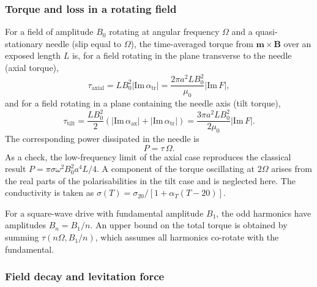 \documentclass[12pt, a4paper]{article}
\begin{document}
\subsubsection*{Torque and loss in a rotating field}

For a field of amplitude $B_0$ rotating at angular frequency $\Omega$ and a quasi-stationary needle (slip equal to $\Omega$), the time-averaged torque from $\mathbf{m}\times\mathbf{B}$ over an exposed length $L$ is, for a field rotating in the plane transverse to the needle (axial torque),
\begin{equation}
\tau_{\text{axial}}
=
L B_0^{2}\left|\mathrm{Im}\,\alpha_{\text{tr}}\right|
=
\frac{2\pi a^{2}L B_0^{2}}{\mu_0}\left|\mathrm{Im}\,F\right|,
\end{equation}
and for a field rotating in a plane containing the needle axis (tilt torque),
\begin{equation}
\tau_{\text{tilt}}
=
\frac{LB_0^{2}}{2}\left(\left|\mathrm{Im}\,\alpha_{\text{ax}}\right|+\left|\mathrm{Im}\,\alpha_{\text{tr}}\right|\right)
=
\frac{3\pi a^{2}LB_0^{2}}{2\mu_0}\left|\mathrm{Im}\,F\right|.
\end{equation}
The corresponding power dissipated in the needle is
\begin{equation}
P=\tau\,\Omega.
\end{equation}
As a check, the low-frequency limit of the axial case reproduces the classical result $P=\pi\sigma\omega^{2}B_0^{2}a^{4}L/4$. A component of the torque oscillating at $2\Omega$ arises from the real parts of the polarisabilities in the tilt case and is neglected here. The conductivity is taken as $\sigma(T)=\sigma_{20}/\left[1+\alpha_T(T-20)\right]$.

For a square-wave drive with fundamental amplitude $B_1$, the odd harmonics have amplitudes $B_n=B_1/n$. An upper bound on the total torque is obtained by summing $\tau(n\Omega,B_1/n)$, which assumes all harmonics co-rotate with the fundamental.

\subsubsection*{Field decay and levitation force}
\end{document}
